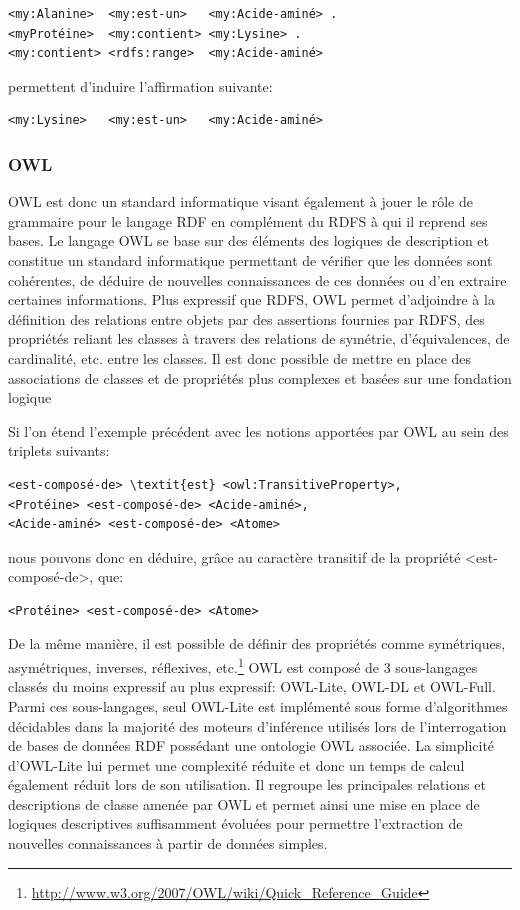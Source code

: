 \begin{lstlisting}
<my:Alanine>  <my:est-un>   <my:Acide-aminé> .
<myProtéine>  <my:contient> <my:Lysine> .
<my:contient> <rdfs:range>  <my:Acide-aminé> 
\end{lstlisting}

permettent d'induire l'affirmation suivante:

\begin{lstlisting}
<my:Lysine>   <my:est-un>   <my:Acide-aminé>
\end{lstlisting}

\subsubsection{OWL} \label{owl}

OWL est donc un standard informatique visant également à jouer le rôle de grammaire pour le langage RDF en complément du RDFS à qui il reprend ses bases. Le langage OWL se base sur des éléments des logiques de description et constitue un standard informatique permettant de vérifier que les données sont cohérentes, de déduire de nouvelles connaissances de ces données ou d'en extraire certaines informations.
Plus expressif que RDFS, OWL permet d'adjoindre à la définition des relations entre objets par des assertions fournies par RDFS, des propriétés reliant les classes à travers des relations de symétrie, d'équivalences, de cardinalité, etc. entre les classes. 
Il est donc possible de mettre en place des associations de classes et de propriétés plus complexes et basées sur une fondation logique  

Si l'on étend l'exemple précédent avec les notions apportées par OWL au sein des triplets suivants:

\begin{lstlisting}
<est-composé-de> \textit{est} <owl:TransitiveProperty>,
<Protéine> <est-composé-de> <Acide-aminé>,
<Acide-aminé> <est-composé-de> <Atome>
\end{lstlisting}

nous pouvons donc en déduire, grâce au caractère transitif de la propriété <est-composé-de>, que:

\begin{lstlisting}
<Protéine> <est-composé-de> <Atome>
\end{lstlisting}

De la même manière, il est possible de définir des propriétés comme symétriques, asymétriques, inverses, réflexives, etc.\footnote{\url{http://www.w3.org/2007/OWL/wiki/Quick_Reference_Guide}}
OWL est composé de 3 sous-langages classés du moins expressif au plus expressif: OWL-Lite, OWL-DL et OWL-Full. Parmi ces sous-langages, seul OWL-Lite est implémenté sous forme d'algorithmes décidables dans la majorité des moteurs d'inférence utilisés lors de l'interrogation de bases de données RDF possédant une ontologie OWL associée. La simplicité d'OWL-Lite lui permet une complexité réduite et donc un temps de calcul également réduit lors de son utilisation. Il regroupe les principales relations et descriptions de classe amenée par OWL et permet ainsi une mise en place de logiques descriptives suffisamment évoluées pour permettre l'extraction de nouvelles connaissances à partir de données simples.

